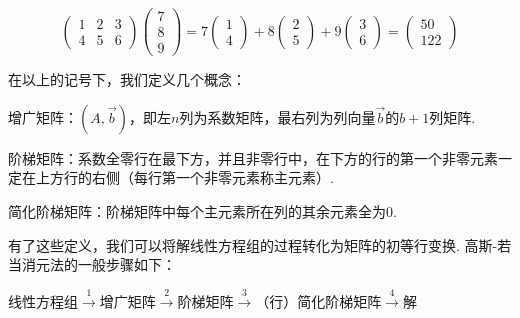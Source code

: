 \[
    \begin{pmatrix}
        1 & 2 & 3 \\ 4 & 5 & 6
    \end{pmatrix} \begin{pmatrix}
        7 \\ 8 \\ 9
    \end{pmatrix} = 7 \begin{pmatrix}
        1 \\ 4
    \end{pmatrix} + 8 \begin{pmatrix}
        2 \\ 5
    \end{pmatrix} + 9 \begin{pmatrix}
        3 \\ 6
    \end{pmatrix} = \begin{pmatrix}
        50 \\ 122
    \end{pmatrix}
\]

在以上的记号下，我们定义几个概念：

增广矩阵：$(A,\vec{b})$，即左$n$列为系数矩阵，最右列为列向量$\vec{b}$的$b+1$列矩阵.

阶梯矩阵：系数全零行在最下方，并且非零行中，在下方的行的第一个非零元素一定在上方行的右侧（每行第一个非零元素称主元素）.

简化阶梯矩阵：阶梯矩阵中每个主元素所在列的其余元素全为$0$.

有了这些定义，我们可以将解线性方程组的过程转化为矩阵的初等行变换. 高斯-若当消元法的一般步骤如下：
\begin{center}
    线性方程组$\overset{1}{\longrightarrow}$增广矩阵$\overset{2}{\longrightarrow}$阶梯矩阵$\overset{3}{\longrightarrow}$（行）简化阶梯矩阵$\overset{4}{\longrightarrow}$解
\end{center}

